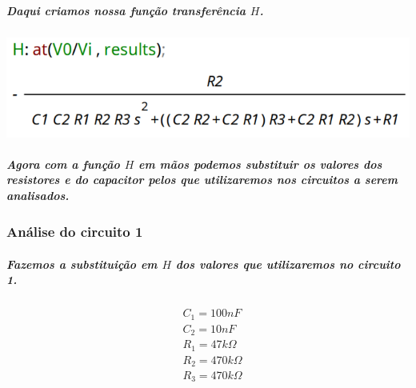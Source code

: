 \documentclass[12pt,twoside, a4paper, twocolumn]{article}
\begin{document}
\subparagraph*{Daqui criamos nossa função transferência $H$.}








\subparagraph*{}








\begin{adjustbox}{scale=0.4}
    \includegraphics{H.png}
\end{adjustbox}








\subparagraph*{Agora com a função $H$ em mãos podemos substituir os valores dos resistores e do capacitor pelos que utilizaremos nos circuitos a serem analisados.}




\subsubsection{Análise do circuito 1}




\subparagraph*{Fazemos a substituição em $H$ dos valores que utilizaremos no circuito 1.}








\begin{equation*}
    \begin{aligned}
         & C_1  = 100nF          \\
         & C_2  = 10nF           \\
         & R_1  = 47k \varOmega  \\
         & R_2  = 470k \varOmega \\
         & R_3  = 470k \varOmega
    \end{aligned}
\end{equation*}
\end{document}
